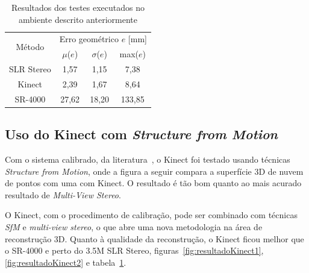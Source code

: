 \begin{table}[htbp]
\caption{Resultados dos testes executados no ambiente descrito anteriormente}
\label{tab:resultadosKinect}
\begin{center}
\begin{tabular}{|c|c|c|c|}
\hline
\multirow{2}{1.5cm}{Método}& \multicolumn{3}{p{5cm}|}{Erro geométrico $e$ [mm]} \bigstrut \\
\cline{2-4} & \multicolumn{1}{c|}{$\mu$($e$)} & \multicolumn{1}{c|}{$\sigma$($e$)} & \multicolumn{1}{c|}{max($e$)} \bigstrut \\ \hline
SLR Stereo & 1,57 & 1,15 & 7,38 \bigstrut \\ \hline
Kinect & 2,39 & 1,67 & 8,64 \bigstrut \\ \hline
SR-4000 & 27,62 & 18,20 & 133,85 \bigstrut \\ 
\hline
\end{tabular}
\end{center}
\end{table}

\subsection{Uso do Kinect com \emph{Structure from Motion}}

Com o sistema calibrado, da literatura~\cite{smisek20133d}, o Kinect foi testado usando técnicas \emph{Structure
from Motion}, onde a figura a seguir compara a superfície 3D de nuvem de pontos
com uma com Kinect.  O resultado é tão bom quanto ao mais
acurado resultado de \emph{Multi-View Stereo}.

O Kinect, com o procedimento de calibração, pode ser combinado
com técnicas \emph{SfM} e \emph{multi-view stereo}, o que abre uma
nova metodologia na área de reconstrução 3D.
Quanto à qualidade da reconstrução, o Kinect ficou melhor que o
SR-4000 e perto do 3.5M SLR Stereo, figuras~\ref{fig:resultadoKinect1}, \ref{fig:resultadoKinect2} e tabela~\ref{tab:resultadosKinect}.

